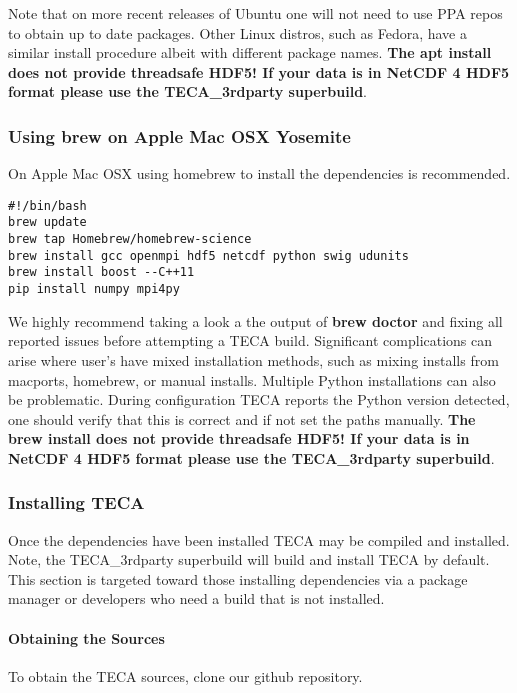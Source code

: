 \documentclass[a4paper,10pt,DIV=12]{scrreprt}
\begin{document}
\noindent Note that on more recent releases of Ubuntu one will not need to use PPA repos to obtain up to date packages.
Other Linux distros, such as Fedora, have a similar install procedure albeit with different package names.
\textbf{\color{red} The apt install does not provide threadsafe HDF5! If your data is in NetCDF 4 HDF5 format please use the
TECA\_3rdparty superbuild}.

\subsubsection{Using brew on Apple Mac OSX Yosemite}
On Apple Mac OSX using homebrew to install the dependencies is recommended.

\vspace{2mm}\hspace{0.2in}\begin{minipage}{0.8\textwidth}
\begin{verbatim}
#!/bin/bash
brew update
brew tap Homebrew/homebrew-science
brew install gcc openmpi hdf5 netcdf python swig udunits
brew install boost --C++11
pip install numpy mpi4py
\end{verbatim}
\end{minipage}\vspace{2mm}

\noindent We highly recommend taking a look a the output of \textbf{brew doctor} and
fixing all reported issues before attempting a TECA build. Significant
complications can arise where user's have mixed installation methods, such as mixing
installs from macports, homebrew, or manual installs. Multiple Python installations
can also be problematic. During configuration TECA reports the Python version detected,
one should verify that this is correct and if not set the paths manually. \textbf{
\color{red} The brew install does not provide threadsafe HDF5! If your data is in
NetCDF 4 HDF5 format please use the TECA\_3rdparty superbuild}.

\subsubsection{Installing TECA}
Once the dependencies have been installed TECA may be compiled and installed. Note,
the TECA\_3rdparty superbuild will build and install TECA by default. This section
is targeted toward those installing dependencies via a package manager or developers
who need a build that is not installed.

\paragraph{Obtaining the Sources} To obtain the TECA sources, clone our github repository.
\end{document}
